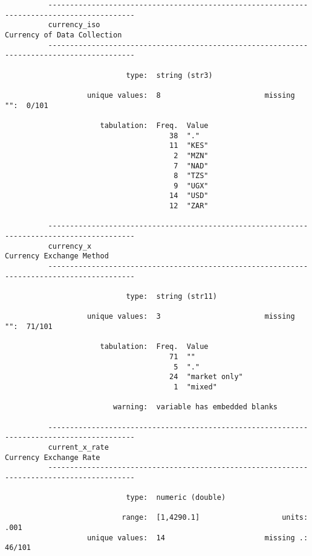 \documentclass{article}
\begin{document}
\begin{verbatim}
          ------------------------------------------------------------------------------------------
          currency_iso                                                   Currency of Data Collection
          ------------------------------------------------------------------------------------------
          
                            type:  string (str3)
          
                   unique values:  8                        missing "":  0/101
          
                      tabulation:  Freq.  Value
                                      38  "."
                                      11  "KES"
                                       2  "MZN"
                                       7  "NAD"
                                       8  "TZS"
                                       9  "UGX"
                                      14  "USD"
                                      12  "ZAR"
          
          ------------------------------------------------------------------------------------------
          currency_x                                                        Currency Exchange Method
          ------------------------------------------------------------------------------------------
          
                            type:  string (str11)
          
                   unique values:  3                        missing "":  71/101
          
                      tabulation:  Freq.  Value
                                      71  ""
                                       5  "."
                                      24  "market only"
                                       1  "mixed"
          
                         warning:  variable has embedded blanks
          
          ------------------------------------------------------------------------------------------
          current_x_rate                                                      Currency Exchange Rate
          ------------------------------------------------------------------------------------------
          
                            type:  numeric (double)
          
                           range:  [1,4290.1]                   units:  .001
                   unique values:  14                       missing .:  46/101
          

\end{verbatim}
\end{document}
